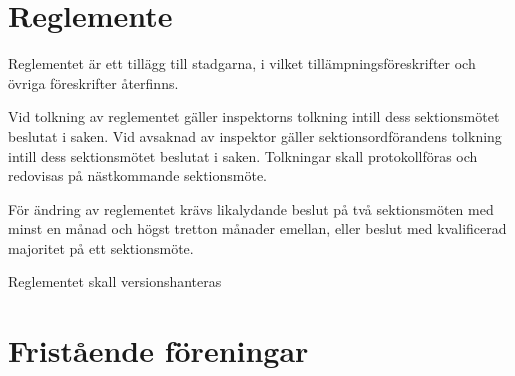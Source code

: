 \documentclass[stadgar]{dsekprotokoll}
\begin{document}
\section{Reglemente}

\begin{stadgeavsnitt}


Reglementet är ett tillägg till stadgarna, i vilket
tillämpningsföreskrifter och övriga föreskrifter återfinns.


Vid tolkning av reglementet gäller inspektorns tolkning intill dess
sektionsmötet beslutat i saken. Vid avsaknad av inspektor gäller
sektionsordförandens tolkning intill dess sektionsmötet beslutat i saken.
Tolkningar skall protokollföras och redovisas på nästkommande
sektionsmöte.


För ändring av reglementet krävs likalydande beslut på två sektionsmöten
med minst en månad och högst tretton månader emellan, eller beslut med
kvalificerad majoritet på ett sektionsmöte.

 Reglementet skall versionshanteras

\end{stadgeavsnitt}

\section{Fristående föreningar}
\end{document}
